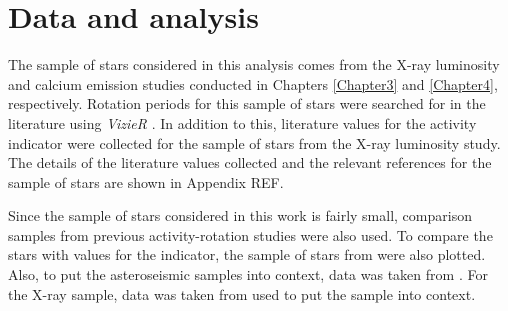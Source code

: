 \section{Data and analysis}

The sample of stars considered in this analysis comes from the X-ray luminosity and calcium emission studies conducted in Chapters \ref{Chapter3} and \ref{Chapter4}, respectively. Rotation periods for this sample of stars were searched for in the literature using \textit{VizieR} \citep{Ochsenbein_etal_2000}. In addition to this, literature values for the \Rprime activity indicator were collected for the sample of stars from the X-ray luminosity study. The details of the literature values collected and the relevant references for the sample of stars are shown in Appendix REF.

Since the sample of stars considered in this work is fairly small, comparison samples from previous activity-rotation studies were also used. To compare the stars with values for the \Rprime indicator, the sample of stars from \citet{Metcalfe_etal_2016} were also plotted. Also, to put the asteroseismic samples into context, data was taken from \citet{Baliunas_etal_1996}. For the X-ray sample, data was taken from \citet{Wright_etal_2011} used to put the sample into context.









































